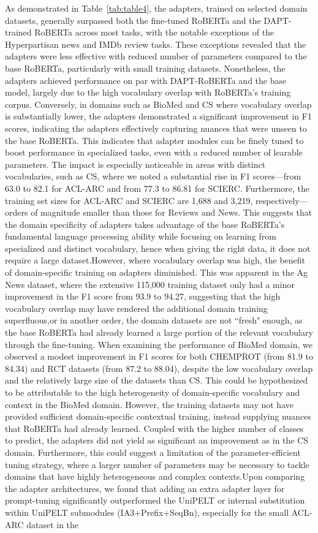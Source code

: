 \documentclass[10pt,twocolumn,letterpaper]{article}
\begin{document}
As demonstrated in Table~\ref{tab:table4}, the adapters, trained on selected domain datasets, generally surpassed both the fine-tuned RoBERTa and the DAPT-trained RoBERTa across most tasks, with the notable exceptions of the Hyperpartisan news and IMDb review tasks. These exceptions revealed that the adapters were less effective with reduced number of parameters compared to the base RoBERTa, particularly with small training datasets. Nonetheless, the adapters achieved performance on par with DAPT-RoBERTa and the base model, largely due to the high vocabulary overlap with RoBERTa's training corpus. Conversely, in domains such as BioMed and CS where vocabulary overlap is substantially lower, the adapters demonstrated a significant improvement in F1 scores, indicating the adapters effectively capturing nuances that were unseen to the base RoBERTa. This indicates that adapter modules can be finely tuned to boost performance in specialized tasks, even with a reduced number of learable parameters. The impact is especially noticeable in areas with distinct vocabularies, such as CS, where we noted a substantial rise in F1 scores—from 63.0 to 82.1 for ACL-ARC and from 77.3 to 86.81 for SCIERC. Furthermore, the training set sizes for ACL-ARC and SCIERC are 1,688 and 3,219, respectively—orders of magnitude smaller than those for Reviews and News. This suggests that the domain specificity of adapters takes advantage of the base RoBERTa's fundamental language processing ability while focusing on learning from specialized and distinct vocabulary, hence when giving the right data, it does not require a large dataset.However, where vocabulary overlap was high, the benefit of domain-specific training on adapters diminished. This was apparent in the Ag News dataset, where the extensive 115,000 training dataset only had a minor improvement in the F1 score from 93.9 to 94.27, suggesting that the high vocabulary overlap may have rendered the additional domain training superfluous,or in another order, the domain datasets are not ``fresh" enough, as the base RoBERTa had already learned a large portion of the relevant vocabulary through the fine-tuning. When examining the performance of BioMed domain, we observed a modest improvement in F1 scores for both CHEMPROT (from 81.9 to 84.34) and RCT datasets (from 87.2 to 88.04), despite the low vocabulary overlap and the relatively large size of the datasets  than CS. This could be hypothesized to be attributable to the high heterogeneity of domain-specific vocabulary and context in the BioMed domain. However, the training datasets may not have provided sufficient domain-specific contextual training, instead supplying nuances that RoBERTa had already learned. Coupled with the higher number of classes to predict, the adapters did not yield as significant an improvement as in the CS domain. Furthermore, this could suggest a limitation of the parameter-efficient tuning strategy, where a larger number of parameters may be necessary to tackle domains that have highly heterogeneous and complex contexts.Upon comparing the adapter architectures, we found that adding an extra adapter layer for prompt-tuning significantly outperformed the UniPELT or internal substitution within UniPELT submodules (IA3+Prefix+SeqBn), especially for the small ACL-ARC dataset in the 
\end{document}
